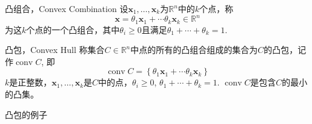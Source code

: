 
\begin{frame}

\begin{block}{凸组合，Convex Combination}
设$\mathbf{x}_1, \ldots, \mathbf{x}_k$为$\mathbb{R}^n$中的$k$个点，称
\[\mathbf{x} = \theta_1\mathbf{x}_1 + \cdots \theta_k\mathbf{x}_k \in \mathbb{R}^n\]
为这$k$个点的一个凸组合，其中$\theta_i \ge 0$且满足$\theta_1 + \cdots + \theta_k = 1$.
\end{block}

\vspace{1em}

\begin{block}{凸包，Convex Hull}
称集合$C\in\mathbb{R}^n$中点的所有的凸组合组成的集合为$C$的凸包，记作$\operatorname{conv} C$, 即
\[\operatorname{conv} C = \left\{ \theta_1\mathbf{x}_1 + \cdots \theta_k\mathbf{x}_k \right\}\]
$k$是正整数，$\mathbf{x}_1, \ldots, \mathbf{x}_k$是$C$中的点，$\theta_i \ge 0$, $\theta_1 + \cdots + \theta_k = 1$. $\operatorname{conv} C$是包含$C$的最小的凸集。
\end{block}

\end{frame}


\begin{frame}

\begin{block}{凸包的例子}
\begin{center}
\end{center}
\end{block}

\end{frame}


